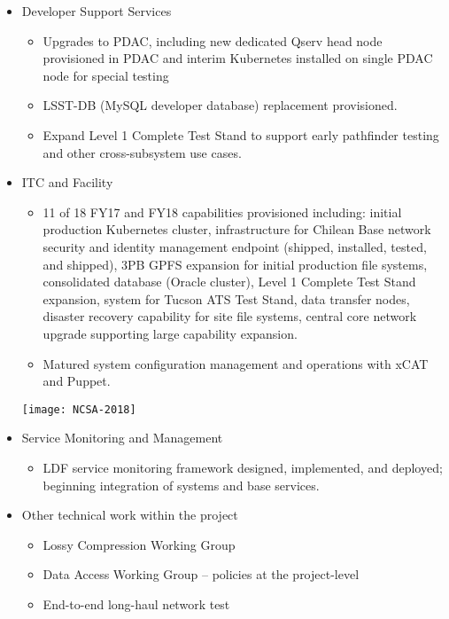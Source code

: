 {\begin{itemize}
\begin{itemize}
\end{itemize}
\item Developer Support Services

\begin{itemize}
    \item Upgrades to PDAC, including new dedicated Qserv head node provisioned in PDAC and interim Kubernetes installed on single PDAC node for special testing
    \item LSST-DB (MySQL developer database) replacement provisioned.
    \item Expand Level 1 Complete Test Stand to support early pathfinder testing and other cross-subsystem use cases.

	\end{itemize}
\item ITC and Facility

	\begin{itemize}
    \item 11 of 18 FY17 and FY18 capabilities provisioned including: initial production Kubernetes cluster, infrastructure for Chilean Base network security and identity management endpoint (shipped, installed, tested, and shipped), 3PB GPFS expansion for initial production file systems, consolidated database (Oracle cluster), Level 1 Complete Test Stand expansion, system for Tucson ATS Test Stand, data transfer nodes, disaster recovery capability for site file systems, central core network upgrade supporting large capability expansion.
    \item Matured system configuration management and operations with xCAT and Puppet.

	\end{itemize}
\texttt{[image: NCSA-2018]}

\item Service Monitoring and Management

\begin{itemize}
    \item LDF service monitoring framework designed, implemented, and deployed; beginning integration of systems and base services.

\end{itemize}
\item Other technical work within the project

	\begin{itemize}
    \item Lossy Compression Working Group
    \item Data Access Working Group -- policies at the project-level
    \item End-to-end long-haul network test
	\end{itemize}
\end{itemize}
}


